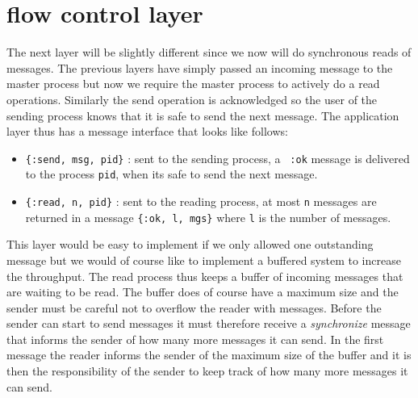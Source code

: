 \documentclass[a4paper,11pt]{article}
\begin{document}
\section{flow control layer}

The next layer will be slightly different since we now will do
synchronous reads of messages. The previous layers have simply passed
an incoming message to the master process but now we require the
master process to actively do a read operations. Similarly the send
operation is acknowledged so the user of the sending process knows
that it is safe to send the next message. The application layer thus
has a message interface that looks like follows:

\begin{itemize}
\item {\tt \{:send, msg, pid\}} : sent to the sending process, a {\tt
    :ok} message is delivered to the process {\tt pid}, when its safe
  to send the next message.

\item {\tt \{:read, n, pid\}} : sent to the reading process, at most
  {\tt n} messages are returned in a message {\tt \{:ok, l, mgs\}}
  where {\tt l} is the number of messages.
\end{itemize}

This layer would be easy to implement if we only allowed one
outstanding message but we would of course like to implement a
buffered system to increase the throughput. The read process thus keeps
a buffer of incoming messages that are waiting to be read. The buffer
does of course have a maximum size and the sender must be careful not
to overflow the reader with messages. Before the sender can start to
send messages it must therefore receive a {\em synchronize} message
that informs the sender of how many more messages it can send. In the
first message the reader informs the sender of the maximum size of the
buffer and it is then the responsibility of the sender to keep track of
how many more messages it can send.
\end{document}
